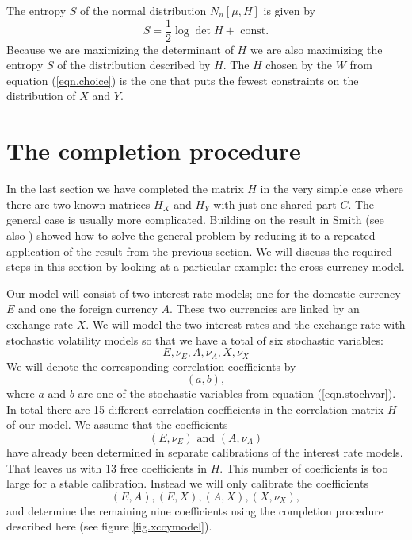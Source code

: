 \documentclass[11pt, a4paper]{article}
\begin{document}
The entropy $S$ of the normal distribution $N_n[\mu,H]$ is given by
\begin{equation}
	S = \frac{1}{2}\log \det H + \text{\ const.}
\end{equation} 
Because we are maximizing the determinant of $H$ we are also maximizing the entropy $S$ of the distribution described by $H$. The $H$ chosen by the $W$ from equation (\ref{eqn.choice}) is the one that puts the fewest constraints on the distribution of $X$ and $Y$. 

\section{The completion procedure}\label{sec.procedure}
In the last section we have completed the matrix $H$ in the very simple case where there are two known matrices $H_X$ and $H_Y$ with just one shared part $C$. The general case is usually more complicated. Building on the result in \cite{grone} Smith \cite{smith} (see also \cite{georgescu}) showed how to solve the general problem by reducing it to a repeated application of the result from the previous section. We will discuss the required steps in this section by looking at a particular example: the cross currency model.

Our model will consist of two interest rate models; one for the domestic currency $E$ and one the foreign currency $A$. These two currencies are linked by an exchange rate $X$. We will model the two interest rates and the exchange rate with stochastic volatility models so that we have a total of six stochastic variables:
\begin{equation}\label{eqn.stochvar}
	E, \nu_E, A, \nu_A, X, \nu_X
\end{equation}
We will denote the corresponding correlation coefficients by 
\begin{equation}
	(a,b),
\end{equation}
where $a$ and $b$ are one of the stochastic variables from equation (\ref{eqn.stochvar}). In total there are 15 different correlation coefficients in the correlation matrix $H$ of our model. We assume that the coefficients 
\begin{equation}
	(E,\nu_E)\text{\ and\ }(A,\nu_A)
\end{equation}
have already been determined in separate calibrations of the interest rate models. That leaves us with 13 free coefficients in $H$. This number of coefficients is too large for a stable calibration. Instead we will only calibrate the coefficients
\begin{equation}
	(E,A), (E,X), (A,X),(X,\nu_X),
\end{equation}
and determine the remaining nine coefficients using the completion procedure described here (see figure \ref{fig.xccymodel}).
\end{document}
